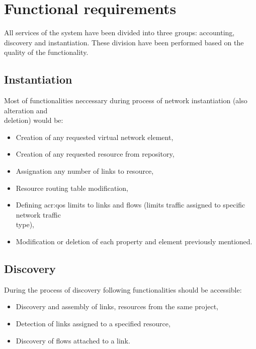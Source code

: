 \documentclass[11pt]{book}
\begin{document}
    \section{Functional requirements}
	
		\label{sec:req:func}
		
		All services of the system have been divided into three groups: accounting, discovery and instantiation.
                These division have been performed based on the quality of the functionality.  

      \subsection{Instantiation}
		\label{sec:req:func:inst}
	  
		Most of functionalities neccessary during process of network instantiation (also alteration and \\ deletion) would be:
		
		\begin{itemize}
			\item{Creation of any requested virtual network element, }
			\item{Creation of any requested resource from repository, }
			\item{Assignation any number of links to resource, }
			\item{Resource routing table modification, }
			\item{Defining \gls{acr:qos} limits to links and flows (limits traffic assigned to specific network traffic \\ type), }
			\item{Modification or deletion of each property and element previously mentioned. }
		\end{itemize}
		

      \subsection{Discovery}
		\label{sec:req:func:disc}
		
		During the process of discovery following functionalities should be accessible:
		
		\begin{itemize}
			\item{Discovery and assembly of links, resources from the same project, }
			\item{Detection of links assigned to a specified resource, }
			\item{Discovery of flows attached to a link. }
		\end{itemize}
\end{document}

